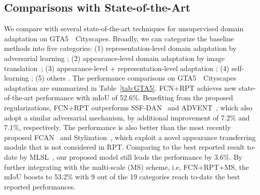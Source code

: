 \documentclass[10pt,twocolumn,letterpaper]{article}
\begin{document}
\subsection{Comparisons with State-of-the-Art}
We compare with several state-of-the-art techniques for unsupervised domain adaptation on GTA5~~Cityscapes. Broadly, we can categorize the baseline methods into five categories: (1) representation-level domain adaptation by adversarial learning \cite{chen2018road,Du_2019_ICCV,pmlr-v80-hoffman18a,hong2018conditional,luo2019taking,sankaranarayanan2018learning,Tsai_2018_CVPR}; (2) appearance-level domain adaptation by image translation~\cite{dundar2018domain,murez2018image}; (3) appearance-level + representation-level adaptation \cite{chang2019all,wu2018dcan,Zhang_2018_CVPR}; (4) self-learning \cite{iqbal2019mlsl,lian2019constructing,zhang2018fully,zou2018unsupervised}; (5) others \cite{Chen_2019_ICCV,li2019bidirectional,saleh2018effective,zhang2017curriculum,zhu2018penalizing}. The performance comparisons on GTA5~~Cityscapes adaptation are summarized in Table~\ref{tab:GTA5}.
FCN+RPT achieves new state-of-the-art performance with mIoU of 52.6\%. Benefiting from the proposed regularizations, FCN+RPT outperforms SSF-DAN~\cite{Du_2019_ICCV} and ADVENT~\cite{Vu_2019_CVPR}, which also adopt a similar adversarial mechanism, by additional improvement of 7.2\% and 7.1\%, respectively. The performance is also better than the most recently proposed FCAN~\cite{Zhang_2018_CVPR} and Stylization~\cite{dundar2018domain}, which exploit a novel appearance transferring module that is not considered in RPT. Comparing to the best reported result to-date by MLSL~\cite{iqbal2019mlsl}, our proposed model still leads the performance by 3.6\%. By further integrating with the multi-scale (MS) scheme, i.e, FCN+RPT+MS, the mIoU boosts to 53.2\% with 9 out of the 19 categories reach to-date the best reported performances.
\end{document}
